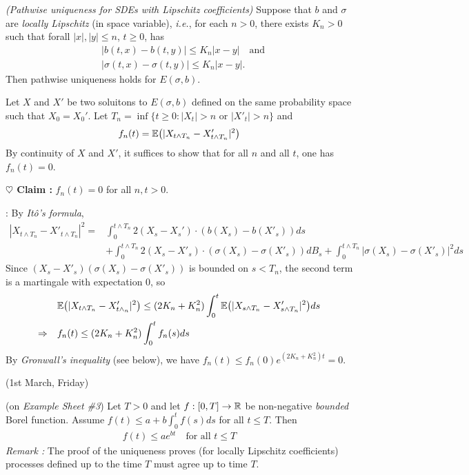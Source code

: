 \documentclass[10pt,a4paper]{article}
\newenvironment{proof}
{\begin{changemargin}{0.5cm}{0.5cm} 
	}%
	{\end{changemargin}
}
\newenvironment{subproof}
{\begin{changemargin}{0.5cm}{0.5cm} 
	}%
	{\end{changemargin}
}
\newenvironment{p}
{\begin{proof} 
	}%
	{\end{proof}
}
\begin{document}
\thm \emph{(Pathwise uniqueness for SDEs with Lipschitz coefficients)} Suppose that $b$ and $\sigma$ are \emph{locally Lipschitz} (in space variable), \textit{i.e.}, for each $n >0$, there exists $K_n >0$ such that forall $|x|, |y| \leq n$, $t\geq 0$, has 
\begin{align*}
&|b(t,x) - b(t, y)| \leq K_n |x-y| \quad \text{and} \\
&|\sigma(t,x) - \sigma(t,y)| \leq K_n |x-y|.
\end{align*}
Then pathwise uniqueness holds for $E(\sigma,b)$.
\begin{p}
\pf Let $X$ and $X'$ be two soluitons to $E(\sigma, b)$ defined on the same probability space such that $X_0 = X_0'$. Let $T_n = \inf \{t\geq 0: |X_t| >n \text{ or }|X'_t| >n \}$ and
\begin{align*}
f_n(t) = \mathbb{E} \big( |X_{t\wedge T_n} - X'_{t\wedge T_n}|^2 \big)
\end{align*}
By continuity of $X$ and $X'$, it suffices to show that for all $n$ and all $t$, one has $f_n(t) =0$. 

\textbf{$\heartsuit$ Claim :} $f_n(t) = 0$ for all $n, t>0$.
\begin{subproof}
: By \emph{It\^o's formula},
\begin{align*}
|X_{t\wedge T_n} - X'_{t\wedge T_n}|^2 = & \int_0^{t\wedge T_n } 2(X_s - X_s') \cdot (b(X_s)- b(X'_s)) ds \\
& + \int_0^{t\wedge T_n} 2(X_s - X'_s) \cdot (\sigma(X_s) - \sigma(X'_s)) dB_s + \int_0^{t\wedge T_n} |\sigma(X_s) - \sigma(X'_s)|^2 ds
\end{align*}
Since $(X_s - X'_s)(\sigma(X_s)- \sigma(X'_s))$ is bounded on $s< T_n$, the second term is a martingale with expectation 0, so
\begin{align*}
& \mathbb{E} \big( |X_{t\wedge T_n} - X'_{t\wedge_n}|^2 \big) \leq  (2K_n + K_n^2) \int_0^{t} \mathbb{E}\big( |X_{s\wedge T_n} - X'_{s\wedge T_n}|^2 \big) ds \\
\Rightarrow \quad &f_n(t) \leq (2K_n + K_n^2) \int_0^{t} f_n(s) ds
\end{align*}
By \emph{Gronwall's inequality} (see below), we have $f_n(t) \leq  f_n(0) e^{(2K_n + K_n^2)t} =0$.
\end{subproof} 
\eop
\end{p}
\s

\newday

(1st March, Friday)
\s

 (on \emph{Example Sheet \#3}) Let $T>0$ and let $f:[0, T] \rightarrow \mathbb{R}$ be non-negative \emph{bounded} Borel function. Assume $f(t) \leq a + b \int_0^t f(s) ds$ for all $t\leq T$. Then
\begin{align*}
f(t) \leq ae^{bt} \quad \text{for all } t\leq T
\end{align*}
\emph{Remark :} The proof of the uniqueness proves (for locally Lipschitz coefficients) processes defined up to the time $T$ must agree up to time $T$.
\end{document}
